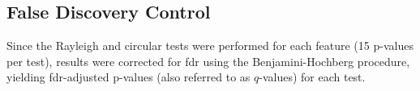 \subsection{False Discovery Control} \label{subsec:fdr}
Since the Rayleigh and circular tests were performed for each feature (15 p-values per test), results were corrected for \gls{fdr} using the Benjamini-Hochberg procedure, yielding \gls{fdr}-adjusted p-values (also referred to as $q$-values) for each test.

